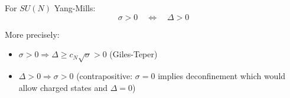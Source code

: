 \begin{corollary}
\label{cor:confinement-gap}
For $SU(N)$ Yang-Mills:
\[
\sigma > 0 \quad \Leftrightarrow \quad \Delta > 0
\]

More precisely:
\begin{itemize}
\item $\sigma > 0 \Rightarrow \Delta \geq c_N\sqrt{\sigma} > 0$ (Giles-Teper)
\item $\Delta > 0 \Rightarrow \sigma > 0$ (contrapositive: $\sigma = 0$ implies deconfinement 
which would allow charged states and $\Delta = 0$)
\end{itemize}
\end{corollary}






